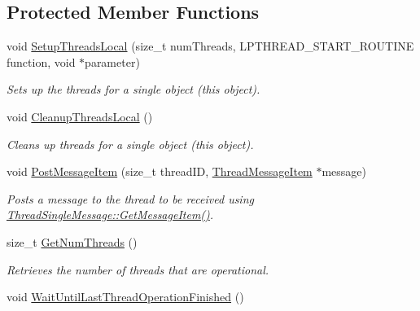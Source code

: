 \subsection*{Protected Member Functions}
\begin{DoxyCompactItemize}
\item 
void \hyperlink{class_thread_single_message_keep_last_user_aa4d9f58bd0327a21bb90aa21b243948e}{SetupThreadsLocal} (size\_\-t numThreads, LPTHREAD\_\-START\_\-ROUTINE function, void $\ast$parameter)
\begin{DoxyCompactList}\small\item\em Sets up the threads for a single object (this object). \item\end{DoxyCompactList}\item 
void \hyperlink{class_thread_single_message_keep_last_user_af26597b6768fdf49e6e0855c81374347}{CleanupThreadsLocal} ()
\begin{DoxyCompactList}\small\item\em Cleans up threads for a single object (this object). \item\end{DoxyCompactList}\item 
void \hyperlink{class_thread_single_message_keep_last_user_a113bd51bdd18a80c6d84b53c36684065}{PostMessageItem} (size\_\-t threadID, \hyperlink{class_thread_message_item}{ThreadMessageItem} $\ast$message)
\begin{DoxyCompactList}\small\item\em Posts a message to the thread to be received using \hyperlink{class_thread_single_message_ac6385cefd086e9c40aa28241caa08d09}{ThreadSingleMessage::GetMessageItem()}. \item\end{DoxyCompactList}\item 
size\_\-t \hyperlink{class_thread_single_message_keep_last_user_a0171ec3a499bf8a716eeb29ef72e3d63}{GetNumThreads} ()
\begin{DoxyCompactList}\small\item\em Retrieves the number of threads that are operational. \item\end{DoxyCompactList}\item 
\hypertarget{class_thread_single_message_keep_last_user_ab537565a4d28d5e4433a855ba637988c}{
void \hyperlink{class_thread_single_message_keep_last_user_ab537565a4d28d5e4433a855ba637988c}{WaitUntilLastThreadOperationFinished} ()}
\label{class_thread_single_message_keep_last_user_ab537565a4d28d5e4433a855ba637988c}


\end{DoxyCompactItemize}
